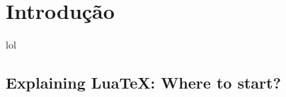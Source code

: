 \documentclass[a4paper,12pt]{article}
\title \DOCTITLE
\author \SURNAMES
\date \FULLDATE
\begin{document}
        
        
        
        

        \tableofcontents
        \thispagestyle{empty}
        \newpage
        \section{Introdução}
            lol
            \subsection{Explaining Lua\TeX: Where to start?}
    
\end{document}
